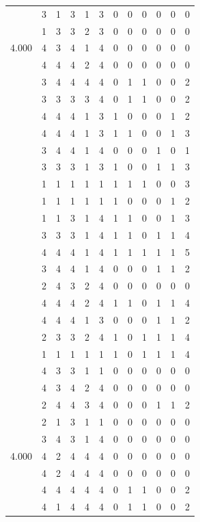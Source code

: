 \documentclass[]{book}
\theoremstyle{definition}
\theoremstyle{definition}
\theoremstyle{definition}
\theoremstyle{remark}
\begin{document}
\begin{table}
{\begin{tabular}[t]{rrrrrrrrrrrr}
 & 3 & 1 & 3 & 1 & 3 & 0 & 0 & 0 & 0 & 0 & 0\\
 & 1 & 3 & 3 & 2 & 3 & 0 & 0 & 0 & 0 & 0 & 0\\
4.000 & 4 & 3 & 4 & 1 & 4 & 0 & 0 & 0 & 0 & 0 & 0\\
 & 4 & 4 & 4 & 2 & 4 & 0 & 0 & 0 & 0 & 0 & 0\\
 & 3 & 4 & 4 & 4 & 4 & 0 & 1 & 1 & 0 & 0 & 2\\
 & 3 & 3 & 3 & 3 & 4 & 0 & 1 & 1 & 0 & 0 & 2\\
 & 4 & 4 & 4 & 1 & 3 & 1 & 0 & 0 & 0 & 1 & 2\\
 & 4 & 4 & 4 & 1 & 3 & 1 & 1 & 0 & 0 & 1 & 3\\
 & 3 & 4 & 4 & 1 & 4 & 0 & 0 & 0 & 1 & 0 & 1\\
 & 3 & 3 & 3 & 1 & 3 & 1 & 0 & 0 & 1 & 1 & 3\\
 & 1 & 1 & 1 & 1 & 1 & 1 & 1 & 1 & 0 & 0 & 3\\
 & 1 & 1 & 1 & 1 & 1 & 1 & 0 & 0 & 0 & 1 & 2\\
 & 1 & 1 & 3 & 1 & 4 & 1 & 1 & 0 & 0 & 1 & 3\\
 & 3 & 3 & 3 & 1 & 4 & 1 & 1 & 0 & 1 & 1 & 4\\
 & 4 & 4 & 4 & 1 & 4 & 1 & 1 & 1 & 1 & 1 & 5\\
 & 3 & 4 & 4 & 1 & 4 & 0 & 0 & 0 & 1 & 1 & 2\\
 & 2 & 4 & 3 & 2 & 4 & 0 & 0 & 0 & 0 & 0 & 0\\
 & 4 & 4 & 4 & 2 & 4 & 1 & 1 & 0 & 1 & 1 & 4\\
 & 4 & 4 & 4 & 1 & 3 & 0 & 0 & 0 & 1 & 1 & 2\\
 & 2 & 3 & 3 & 2 & 4 & 1 & 0 & 1 & 1 & 1 & 4\\
 & 1 & 1 & 1 & 1 & 1 & 1 & 0 & 1 & 1 & 1 & 4\\
 & 4 & 3 & 3 & 1 & 1 & 0 & 0 & 0 & 0 & 0 & 0\\
 & 4 & 3 & 4 & 2 & 4 & 0 & 0 & 0 & 0 & 0 & 0\\
 & 2 & 4 & 4 & 3 & 4 & 0 & 0 & 0 & 1 & 1 & 2\\
 & 2 & 1 & 3 & 1 & 1 & 0 & 0 & 0 & 0 & 0 & 0\\
 & 3 & 4 & 3 & 1 & 4 & 0 & 0 & 0 & 0 & 0 & 0\\
4.000 & 4 & 2 & 4 & 4 & 4 & 0 & 0 & 0 & 0 & 0 & 0\\
 & 4 & 2 & 4 & 4 & 4 & 0 & 0 & 0 & 0 & 0 & 0\\
 & 4 & 4 & 4 & 4 & 4 & 0 & 1 & 1 & 0 & 0 & 2\\
 & 4 & 1 & 4 & 4 & 4 & 0 & 1 & 1 & 0 & 0 & 2\\

\end{tabular}}
\end{table}
\end{document}

